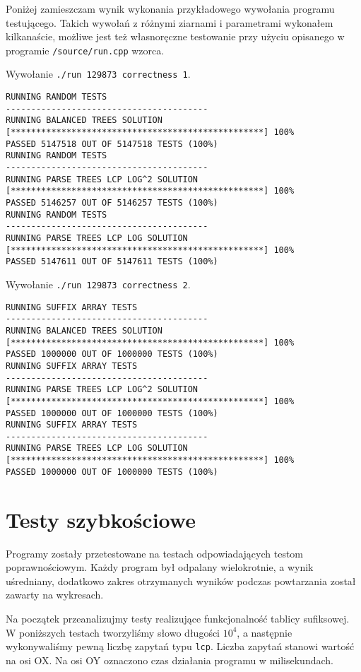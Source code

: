 \documentclass[declaration,shortabstract]{iithesis}
\theoremstyle{definition} \newtheorem{definition}{Definicja}[chapter]
\theoremstyle{plain} \newtheorem{remark}[definition]{Obserwacja}
\theoremstyle{plain} \newtheorem{theorem}[definition]{Twierdzenie}
\theoremstyle{plain} \newtheorem{example}{Przykład}[definition]
\theoremstyle{plain} \newtheorem{lemma}[definition]{Lemat}
\begin{document}
Poniżej zamieszczam wynik wykonania przykładowego wywołania programu testującego. Takich wywołań z różnymi ziarnami i parametrami wykonałem kilkanaście, możliwe jest też własnoręczne testowanie przy użyciu opisanego w programie \texttt{/source/run.cpp} wzorca.

\noindent
Wywołanie \texttt{./run 129873 correctness 1}.

\begin{lstlisting}[basicstyle=\tiny,frame=single]
RUNNING RANDOM TESTS
----------------------------------------
RUNNING BALANCED TREES SOLUTION
[**************************************************] 100%
PASSED 5147518 OUT OF 5147518 TESTS (100%)
RUNNING RANDOM TESTS
----------------------------------------
RUNNING PARSE TREES LCP LOG^2 SOLUTION
[**************************************************] 100%
PASSED 5146257 OUT OF 5146257 TESTS (100%)
RUNNING RANDOM TESTS
----------------------------------------
RUNNING PARSE TREES LCP LOG SOLUTION
[**************************************************] 100%
PASSED 5147611 OUT OF 5147611 TESTS (100%)
\end{lstlisting}

\noindent
Wywołanie \texttt{./run 129873 correctness 2}.

\begin{lstlisting}[basicstyle=\tiny,frame=single]
RUNNING SUFFIX ARRAY TESTS
----------------------------------------
RUNNING BALANCED TREES SOLUTION
[**************************************************] 100%
PASSED 1000000 OUT OF 1000000 TESTS (100%)
RUNNING SUFFIX ARRAY TESTS
----------------------------------------
RUNNING PARSE TREES LCP LOG^2 SOLUTION
[**************************************************] 100%
PASSED 1000000 OUT OF 1000000 TESTS (100%)
RUNNING SUFFIX ARRAY TESTS
----------------------------------------
RUNNING PARSE TREES LCP LOG SOLUTION
[**************************************************] 100%
PASSED 1000000 OUT OF 1000000 TESTS (100%)    
\end{lstlisting}

\section{Testy szybkościowe}

Programy zostały przetestowane na testach odpowiadających testom poprawnościowym. Każdy program był odpalany wielokrotnie, a wynik uśredniany, dodatkowo zakres otrzymanych wyników podczas powtarzania został zawarty na wykresach.

Na początek przeanalizujmy testy realizujące funkcjonalność tablicy sufiksowej. W poniższych testach tworzyliśmy słowo długości $10^4$, a następnie wykonywaliśmy pewną liczbę zapytań typu \texttt{lcp}. Liczba zapytań stanowi wartość na osi OX. Na osi OY oznaczono czas działania programu w milisekundach.
\end{document}
